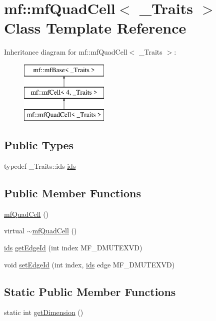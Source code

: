 \hypertarget{classmf_1_1mfQuadCell}{
\section{mf::mfQuadCell$<$ \_\-Traits $>$ Class Template Reference}
\label{classmf_1_1mfQuadCell}
}
Inheritance diagram for mf::mfQuadCell$<$ \_\-Traits $>$:\begin{figure}[H]
\begin{center}
\leavevmode
\includegraphics[height=3.000000cm]{classmf_1_1mfQuadCell}
\end{center}
\end{figure}
\subsection*{Public Types}
\begin{DoxyCompactItemize}
\item 
typedef \_\-Traits::ids \hyperlink{classmf_1_1mfQuadCell_a443cbcdcefb50bddded8078d38869040}{ids}
\end{DoxyCompactItemize}
\subsection*{Public Member Functions}
\begin{DoxyCompactItemize}
\item 
\hyperlink{classmf_1_1mfQuadCell_a9b368af5dac34f90ec4bb803624abb08}{mfQuadCell} ()
\item 
virtual \hyperlink{classmf_1_1mfQuadCell_af8546dd501a6b21051b0924667135ed7}{$\sim$mfQuadCell} ()
\item 
\hyperlink{classmf_1_1mfBase_a3b23f16ddf59da0a91ab12cf57c1f111}{ids} \hyperlink{classmf_1_1mfQuadCell_aad6ab1fce113adefd8531daaf5141cae}{getEdgeId} (int index MF\_\-DMUTEXVD)
\item 
void \hyperlink{classmf_1_1mfQuadCell_acdbd1895f8ee380416c289d26a24f6db}{setEdgeId} (int index, \hyperlink{classmf_1_1mfBase_a3b23f16ddf59da0a91ab12cf57c1f111}{ids} edge MF\_\-DMUTEXVD)
\end{DoxyCompactItemize}
\subsection*{Static Public Member Functions}
\begin{DoxyCompactItemize}
\item 
static int \hyperlink{classmf_1_1mfQuadCell_a797da8c9839219488be115b41d9ebe6b}{getDimension} ()
\end{DoxyCompactItemize}
